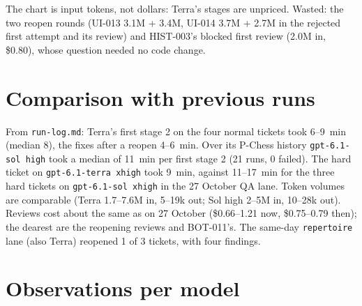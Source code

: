 \documentclass[11pt,a4paper]{article}
\begin{document}
The chart is input tokens, not dollars: Terra's stages are unpriced. Wasted: the two reopen
rounds (UI-013 3.1M + 3.4M, UI-014 3.7M + 2.7M in the rejected first attempt and its review)
and HIST-003's blocked first review (2.0M in, \$0.80), whose question needed no code change.

\section*{Comparison with previous runs}

From \texttt{run-log.md}: Terra's first stage 2 on the four normal tickets took 6--9~min
(median 8), the fixes after a reopen 4--6~min. Over its P-Chess history
\texttt{gpt-6.1-sol high} took a median of 11~min per first stage 2 (21 runs, 0 failed). The
hard ticket on \texttt{gpt-6.1-terra xhigh} took 9~min, against 11--17~min for the three hard
tickets on \texttt{gpt-6.1-sol xhigh} in the 27 October QA lane. Token volumes are comparable
(Terra 1.7--7.6M in, 5--19k out; Sol high 2--5M in, 10--28k out). Reviews cost about the same as
on 27 October (\$0.66--1.21 now, \$0.75--0.79 then); the dearest are the reopening reviews and
BOT-011's. The same-day \texttt{repertoire} lane (also Terra) reopened 1 of 3 tickets, with
four findings.

\section*{Observations per model}
\end{document}

